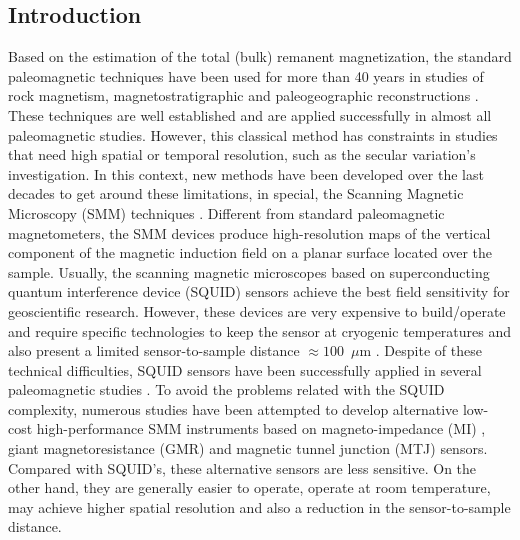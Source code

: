 \documentclass[galley,gc]{agutex}
\begin{document}
\begin{article}




\section{Introduction}
\label{sec:Introduction}

Based on the estimation of the total (bulk) remanent magnetization, the standard 
paleomagnetic techniques have been used for more than 40 years in studies of rock magnetism, 
magnetostratigraphic and paleogeographic reconstructions \citep{voo1993}. These techniques 
are well established and are applied successfully in almost all paleomagnetic studies. 
However, this classical method has constraints in studies that need high spatial or 
temporal resolution, such as the secular variation's investigation. In this context, new 
methods have been developed over the last decades to get around these limitations, in special, 
the Scanning Magnetic Microscopy (SMM) techniques \citep{kirschvink2008, oda2011, fu2014}. 
Different from 
standard paleomagnetic magnetometers, the SMM devices produce high-resolution maps of the 
vertical component of the magnetic induction field on a planar surface located over the 
sample. Usually, the scanning magnetic microscopes based on superconducting quantum 
interference device (SQUID) sensors achieve the best field sensitivity for geoscientific 
research. However, these devices are very expensive to build/operate and require specific 
technologies to keep the sensor at cryogenic temperatures and also present a limited 
sensor-to-sample distance $\approx 100$~$\mu$m \citep{baudenbacher2003, fong2005}. 
Despite of these technical difficulties, SQUID sensors have been successfully applied 
in several paleomagnetic studies 
\citep{gattacceca2006, weiss2007b, oda2011, fu2014, kirschvink2015}. 
To avoid the problems related with the SQUID complexity, numerous studies have been 
attempted to develop alternative low-cost high-performance SMM instruments based on 
magneto-impedance (MI) \citep{uehara2007, uehara2008}, giant magnetoresistance (GMR) 
\citep{hankard2009} and magnetic tunnel junction (MTJ) \citep{lima2014} sensors. 
Compared with SQUID's, these alternative sensors are less sensitive. On the other 
hand, they are generally easier to operate, operate at room temperature, 
may achieve higher spatial resolution and also a reduction in the sensor-to-sample 
distance.


\end{article}
\end{document}
